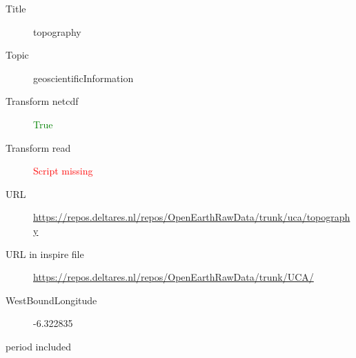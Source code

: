 \documentclass[9]{report}
\begin{document}
\begin{description}
  \item[Title]  topography 
  \item[Topic] geoscientificInformation
  \item[Transform netcdf] \textcolor{green}{True}
  \item[Transform read] \textcolor{red}{Script missing}
  \item[URL] \href{https://repos.deltares.nl/repos/OpenEarthRawData/trunk/uca/topography}{https://repos.deltares.nl/repos/OpenEarthRawData/trunk/uca/topography}
  \item[URL in inspire file] \href{https://repos.deltares.nl/repos/OpenEarthRawData/trunk/UCA/}{https://repos.deltares.nl/repos/OpenEarthRawData/trunk/UCA/}
  \item[WestBoundLongitude] -6.322835
  \item[period included] 
\end{description}
\end{document}
